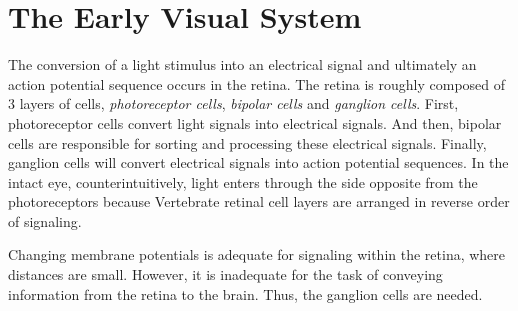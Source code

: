 \section{The Early Visual System}
\label{sec:EarlyVisualSystem}
\begin{prin}
  \label{prin:retina}
  The conversion of a light stimulus into an electrical signal and ultimately an action potential sequence occurs in the retina.
  The retina is roughly composed of 3 layers of cells, \emph{photoreceptor cells}, \emph{bipolar cells} and \emph{ganglion cells}. First, photoreceptor cells convert light signals into electrical signals. And then, bipolar cells are responsible for sorting and processing these electrical signals. Finally, ganglion cells will convert electrical signals into action potential sequences.
   In the intact eye, counterintuitively, light enters through the side opposite from the photoreceptors because Vertebrate retinal cell layers are arranged in reverse order of signaling.
\end{prin}

\begin{rem}
   Changing membrane potentials is adequate for signaling within the retina, where distances are small. However, it is inadequate for the task of conveying information from the retina to the brain. Thus, the ganglion cells are needed.
\end{rem}

